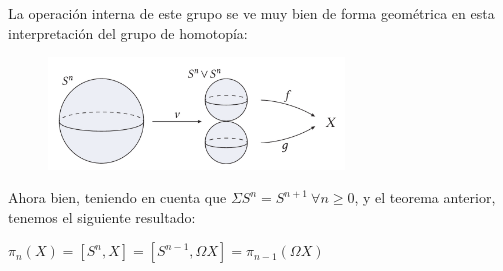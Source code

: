 La operación interna de este grupo se ve muy bien de forma geométrica en esta interpretación del grupo de homotopía: \par
\begin{figure}[h]
\centering
\includegraphics[width=0.7\textwidth]{images/ejgruphomot.pdf}
\end{figure}

Ahora bien, teniendo en cuenta que $\Sigma S^n = S^{n+1} \ \forall n \geq 0$, y el teorema anterior, tenemos el siguiente resultado:
\begin{teor}
$\pi_n(X) = [S^n, X] = [S^{n-1}, \Omega X] = \pi_{n-1}(\Omega X)$
\end{teor}